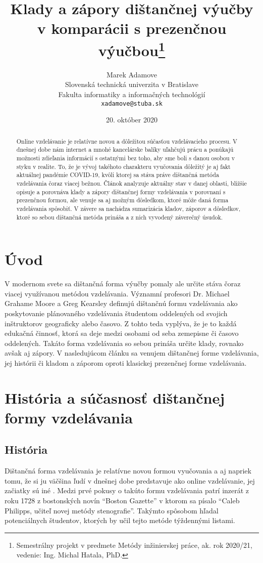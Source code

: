\documentclass[10pt,twoside,slovak,a4paper]{article}
\title{Klady a zápory dištančnej výučby v komparácii s prezenčnou výučbou\thanks{Semestrálny projekt v predmete Metódy inžinierskej práce, ak. rok 2020/21, vedenie: Ing. Michal Hatala, PhD.}}
\author{Marek Adamove\\[2pt]
	{\small Slovenská technická univerzita v Bratislave}\\
	{\small Fakulta informatiky a informačných technológií}\\
	{\small \texttt{xadamove@stuba.sk}}
	}
\date{\small 20. október 2020}
\begin{document}
\maketitle

\begin{abstract}
Online vzdelávanie je relatívne novou a dôležitou súčasťou vzdelávacieho procesu. V dnešnej
dobe nám internet a mnohé kancelárske balíky uľahčujú prácu a ponúkajú možnosti zdieľania informácií
s ostatnými bez toho, aby sme boli s danou osobou v styku v realite. To, že je vývoj takéhoto charakteru vyučovania dôležitý je aj fakt aktuálnej pandémie COVID-19, kvôli ktorej sa stáva práve dištančná metóda vzdelávania čoraz viacej bežnou. Článok analyzuje aktuálny stav v danej oblasti, bližšie opisuje a porovnáva klady a zápory dištančnej formy vzdelávania v porovnaní s prezenčnou formou, ale venuje sa aj možným dôsledkom, ktoré môže daná forma vzdelávania spôsobiť. V závere sa nachádza sumarizácia kladov, záporov a dôsledkov, ktoré so sebou dištančná metóda prináša a z nich vyvodený záverečný úsudok.
\end{abstract}



\section{Úvod}

	V modernom svete sa dištančná forma výučby pomaly ale určite stáva čoraz viacej využívanou metódou vzdelávania. Významní profesori Dr. Michael Grahame Moore a Greg Kearsley definujú dištančnú formu vzdelávania ako poskytovanie plánovaného vzdelávania študentom oddelených od svojich inštruktorov geograficky alebo časovo. Z tohto teda vyplýva, že je to každá edukačná činnosť, ktorá sa deje medzi osobami od seba zemepisne či časovo oddelených. Takáto forma vzdelávania so sebou prináša určite klady, rovnako avšak aj zápory. V nasledujúcom článku sa venujem dištančnej forme vzdelávania, jej histórii či kladom a záporom oproti klasickej prezenčnej forme vzdelávania.



\section{História a súčasnosť dištančnej formy vzdelávania} 
	\subsection{História}
	Dištančná forma vzdelávania je relatívne novou formou vyučovania a aj napriek tomu, že si ju väčšina ľudí v dnešnej dobe predstavuje ako online vzdelávanie, jej začiatky sú iné . Medzi prvé pokusy o takúto formu vzdelávania patrí inzerát z roku 1728 z bostonských novín “Boston Gazette” v ktorom sa písalo “Caleb Philipps, učiteľ novej metódy stenografie”. Takýmto spôsobom hľadal potenciálnych študentov, ktorých by učil tejto metóde týždennými listami. 
\end{document}
